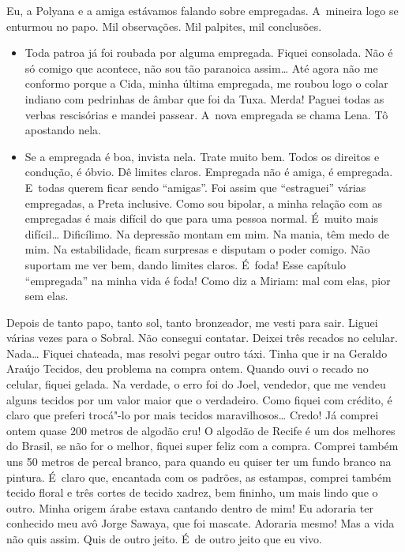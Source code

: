 Eu, a Polyana e a amiga estávamos falando sobre empregadas. A~mineira logo se enturmou no papo. Mil observações. Mil palpites, mil conclusões.

\begin{itemize}
\item
  Toda patroa já foi roubada por alguma empregada. Fiquei consolada. Não
  é só comigo que acontece, não sou tão paranoica assim… Até
  agora não me conformo porque a Cida, minha última empregada, me roubou
  logo o colar indiano com pedrinhas de âmbar que foi da Tuxa. Merda!
  Paguei todas as verbas rescisórias e mandei passear. A~nova empregada
  se chama Lena. Tô apostando nela.
\item
  Se a empregada é boa, invista nela. Trate muito bem. Todos os direitos
  e condução, é óbvio. Dê limites claros. Empregada não é amiga, é
  empregada. E~todas querem ficar sendo ``amigas''. Foi assim que
  ``estraguei'' várias empregadas, a Preta inclusive. Como sou bipolar,
  a minha relação com as empregadas é mais difícil do que para uma
  pessoa normal. É~muito mais difícil… Dificílimo. Na depressão
  montam em mim. Na mania, têm medo de mim. Na estabilidade, ficam
  surpresas e disputam o poder comigo. Não suportam me ver bem, dando
  limites claros. É~foda! Esse capítulo ``empregada'' na minha vida é
  foda! Como diz a Miriam: mal com elas, pior sem elas.
\end{itemize}
Depois de tanto papo, tanto sol, tanto bronzeador, me vesti para sair.
Liguei várias vezes para o Sobral. Não consegui contatar. Deixei três
recados no celular. Nada… Fiquei chateada, mas resolvi pegar
outro táxi. Tinha que ir na Geraldo Araújo Tecidos, deu problema na
compra ontem. Quando ouvi o recado no celular, fiquei gelada. Na
verdade, o erro foi do Joel, vendedor, que me vendeu alguns tecidos por
um valor maior que o verdadeiro. Como fiquei com crédito, é claro que
preferi trocá"-lo por mais tecidos maravilhosos… Credo! Já comprei
ontem quase 200 metros de algodão cru! O algodão de Recife é um dos
melhores do Brasil, se não for o melhor, fiquei super feliz com a
compra. Comprei também uns 50 metros de percal branco, para quando eu
quiser ter um fundo branco na pintura. É~claro que, encantada com os
padrões, as estampas, comprei também tecido floral e três cortes de
tecido xadrez, bem fininho, um mais lindo que o outro. Minha origem
árabe estava cantando dentro de mim! Eu adoraria ter conhecido meu avô
Jorge Sawaya, que foi mascate. Adoraria mesmo! Mas a vida não quis
assim. Quis de outro jeito. É~de outro jeito que eu vivo.

